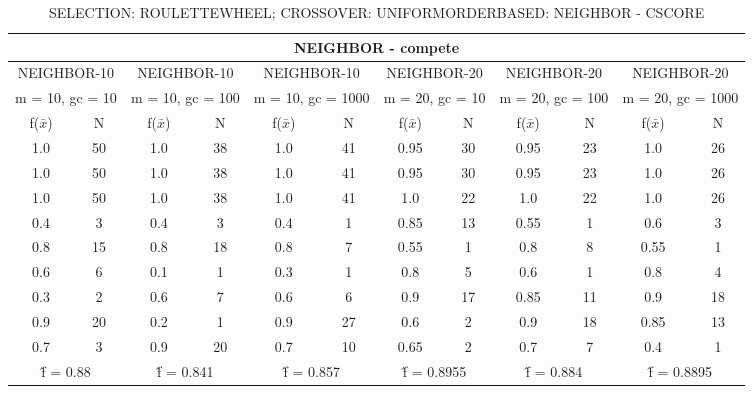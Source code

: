 \begin{table}[H]
	\centering
	\caption{SELECTION: ROULETTEWHEEL; CROSSOVER: UNIFORMORDERBASED: NEIGHBOR - CSCORE}
	\begin{adjustbox}{width=1\textwidth}
		\begin{tabular}{ |c|c||c|c||c|c||c|c||c|c||c|c| }
			\hline
			\multicolumn{12}{|c|}{NEIGHBOR - compete} \\
			\hline
			\multicolumn{2}{|c||}{NEIGHBOR-10} & \multicolumn{2}{c||}{NEIGHBOR-10} & \multicolumn{2}{c||}{NEIGHBOR-10} & \multicolumn{2}{c||}{NEIGHBOR-20} & \multicolumn{2}{c||}{NEIGHBOR-20} & \multicolumn{2}{c|}{NEIGHBOR-20}\\
			\hline
			\multicolumn{2}{|c||}{m = 10, gc = 10} & \multicolumn{2}{c||}{m = 10, gc = 100} & \multicolumn{2}{c||}{m = 10, gc = 1000} & \multicolumn{2}{c||}{m = 20, gc = 10} & \multicolumn{2}{c||}{m = 20, gc = 100} & \multicolumn{2}{c|}{m = 20, gc = 1000}\\
			\hline
			f($\bar{x}$) & N & f($\bar{x}$) & N & f($\bar{x}$) & N & f($\bar{x}$) & N & f($\bar{x}$) & N & f($\bar{x}$) & N\\
			\hline
			\hline
			1.0 & 50 & 1.0 & 38 & 1.0 & 41 & 0.95 & 30 & 0.95 & 23 & 1.0 & 26\\
			\hline
			1.0 & 50 & 1.0 & 38 & 1.0 & 41 & 0.95 & 30 & 0.95 & 23 & 1.0 & 26\\
			1.0 & 50 & 1.0 & 38 & 1.0 & 41 & 1.0 & 22 & 1.0 & 22 & 1.0 & 26\\
			0.4 & 3 & 0.4 & 3 & 0.4 & 1 & 0.85 & 13 & 0.55 & 1 & 0.6 & 3\\
			0.8 & 15 & 0.8 & 18 & 0.8 & 7 & 0.55 & 1 & 0.8 & 8 & 0.55 & 1\\
			0.6 & 6 & 0.1 & 1 & 0.3 & 1 & 0.8 & 5 & 0.6 & 1 & 0.8 & 4\\
			0.3 & 2 & 0.6 & 7 & 0.6 & 6 & 0.9 & 17 & 0.85 & 11 & 0.9 & 18\\
			0.9 & 20 & 0.2 & 1 & 0.9 & 27 & 0.6 & 2 & 0.9 & 18 & 0.85 & 13\\
			0.7 & 3 & 0.9 & 20 & 0.7 & 10 & 0.65 & 2 & 0.7 & 7 & 0.4 & 1\\
			\hline
			\multicolumn{2}{|c||}{\^{f} = 0.88} & \multicolumn{2}{c||}{\^{f} = 0.841} & \multicolumn{2}{c||}{\^{f} = 0.857} & \multicolumn{2}{c||}{\^{f} = 0.8955} & \multicolumn{2}{c||}{\^{f} = 0.884} & \multicolumn{2}{c|}{\^{f} = 0.8895}\\
			\hline
		\end{tabular}
	\end{adjustbox}
	\label{tab-5p-res3}
\end{table}


